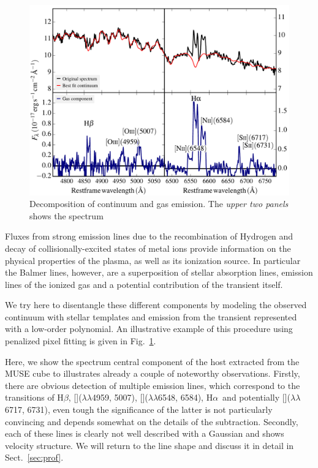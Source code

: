 \documentclass[traditabstract]{aa}
\newcommand{\hb}{H$\beta$}
\newcommand{\ha}{H$\alpha$}
\newcommand{\sii}{[\ion{S}{ii}]}
\newcommand{\oiii}{[\ion{O}{iii}]}
\newcommand{\nii}{[\ion{N}{ii}]}
\begin{document}
\begin{figure}
  \includegraphics[width=0.999\linewidth]{fig/MUSE_stargas.pdf}
\caption{Decomposition of continuum and gas emission. The \textit{upper two panels} shows the spectrum}
\label{fig:stargas}
\end{figure}

Fluxes from strong emission lines due to the recombination of Hydrogen and decay of collisionally-excited states of metal ions provide information on the physical properties of the plasma, as well as its ionization source. In particular the Balmer lines, however, are a superposition of stellar absorption lines, emission lines of the ionized gas and a potential contribution of the transient itself. 

We try here to disentangle these different components by modeling the observed continuum with stellar templates and emission from the transient represented with a low-order polynomial. An illustrative example of this procedure using penalized pixel fitting \citep[pPXF,][]{2004PASP..116..138C, 2017MNRAS.466..798C} is given in Fig.~\ref{fig:stargas}.

Here, we show the spectrum central component of the host extracted from the MUSE cube to illustrates already a couple of noteworthy observations. Firstly, there are obvious detection of multiple emission lines, which correspond to the transitions of \hb, \oiii($\lambda\lambda$4959, 5007), \nii($\lambda\lambda$6548, 6584), \ha\, and potentially \sii($\lambda\lambda$6717, 6731), even tough the significance of the latter is not particularly convincing and depends somewhat on the details of the subtraction. Secondly, each of these lines is clearly not well described with a Gaussian and shows velocity structure. We will return to the line shape and discuss it in detail in Sect.~\ref{sec:prof}.
\end{document}
